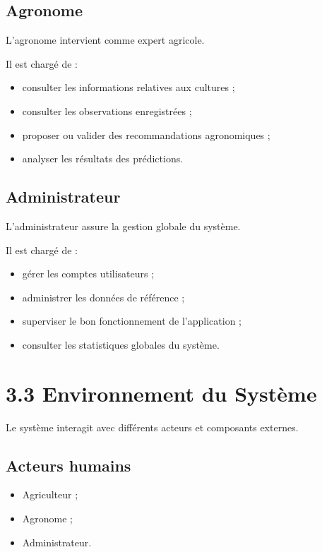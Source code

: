 \documentclass[12pt,a4paper]{report}
\begin{document}
\subsection{Agronome}\label{agronome}

L'agronome intervient comme expert agricole.

Il est chargé de :

\begin{itemize}
\item
  consulter les informations relatives aux cultures ;
\item
  consulter les observations enregistrées ;
\item
  proposer ou valider des recommandations agronomiques ;
\item
  analyser les résultats des prédictions.
\end{itemize}

\subsection{Administrateur}\label{administrateur}

L'administrateur assure la gestion globale du système.

Il est chargé de :

\begin{itemize}
\item
  gérer les comptes utilisateurs ;
\item
  administrer les données de référence ;
\item
  superviser le bon fonctionnement de l'application ;
\item
  consulter les statistiques globales du système.
\end{itemize}

\section{3.3 Environnement du
Système}\label{environnement-du-systuxe8me}

Le système interagit avec différents acteurs et composants externes.

\subsection{Acteurs humains}\label{acteurs-humains}

\begin{itemize}
\item
  Agriculteur ;
\item
  Agronome ;
\item
  Administrateur.
\end{itemize}
\end{document}
